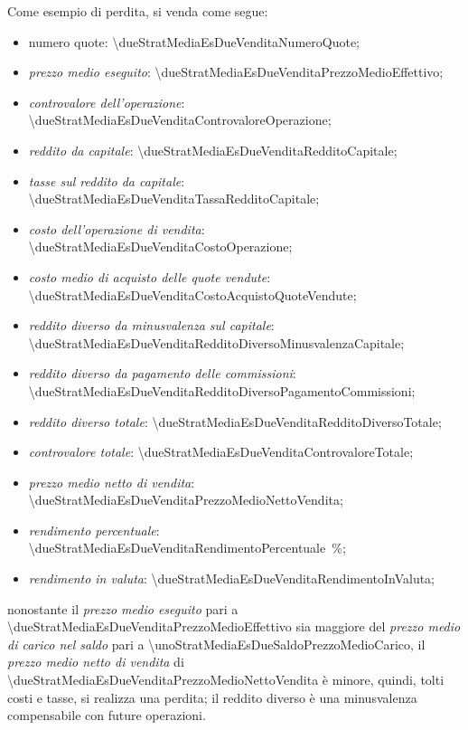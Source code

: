 \documentclass[12pt,a4paper]{article}
\newcommand{\Eur}[1]{\SI{#1}{\text{\euro{}}}}
\begin{document}

Come esempio di perdita, si venda come segue:
\begin{itemize}
\item numero quote: \num{\dueStratMediaEsDueVenditaNumeroQuote};
\item \emph{prezzo medio eseguito}: \Eur{\dueStratMediaEsDueVenditaPrezzoMedioEffettivo};
\item \emph{controvalore dell'operazione}: \Eur{\dueStratMediaEsDueVenditaControvaloreOperazione};

\item \emph{reddito da capitale}: \Eur{\dueStratMediaEsDueVenditaRedditoCapitale};
\item \emph{tasse sul reddito da capitale}: \Eur{\dueStratMediaEsDueVenditaTassaRedditoCapitale};

\item \emph{costo dell'operazione di vendita}: \Eur{\dueStratMediaEsDueVenditaCostoOperazione};
\item \emph{costo medio di acquisto delle quote vendute}: \Eur{\dueStratMediaEsDueVenditaCostoAcquistoQuoteVendute};
\item \emph{reddito diverso da minusvalenza sul capitale}: \Eur{\dueStratMediaEsDueVenditaRedditoDiversoMinusvalenzaCapitale};
\item \emph{reddito diverso da pagamento delle commissioni}: \Eur{\dueStratMediaEsDueVenditaRedditoDiversoPagamentoCommissioni};
\item \emph{reddito diverso totale}: \Eur{\dueStratMediaEsDueVenditaRedditoDiversoTotale};

\item \emph{controvalore totale}: \Eur{\dueStratMediaEsDueVenditaControvaloreTotale};

\item \emph{prezzo medio netto di vendita}: \Eur{\dueStratMediaEsDueVenditaPrezzoMedioNettoVendita};
\item \emph{rendimento percentuale}: \SI{\dueStratMediaEsDueVenditaRendimentoPercentuale}{\percent};
\item \emph{rendimento in valuta}: \Eur{\dueStratMediaEsDueVenditaRendimentoInValuta};
\end{itemize}
nonostante          il         \emph{prezzo          medio         eseguito}          pari         a
\Eur{\dueStratMediaEsDueVenditaPrezzoMedioEffettivo} sia  maggiore del \emph{prezzo medio  di carico
   nel saldo} pari a \Eur{\unoStratMediaEsDueSaldoPrezzoMedioCarico}, il \emph{prezzo medio netto di
   vendita} di \Eur{\dueStratMediaEsDueVenditaPrezzoMedioNettoVendita} è minore, quindi, tolti costi
e tasse,  si realizza una  perdita; il  reddito diverso è  una minusvalenza compensabile  con future
operazioni.
\end{document}
